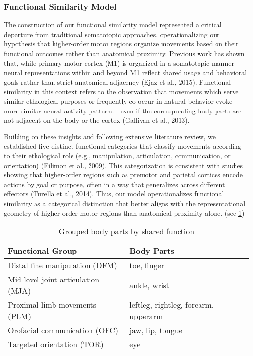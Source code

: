 \documentclass{article}
\begin{document}
\subsubsection{Functional Similarity Model}\label{models}
The construction of our functional similarity model represented a critical departure from traditional somatotopic approaches, operationalizing our hypothesis that higher-order motor regions organize movements based on their functional outcomes rather than anatomical proximity. Previous work has shown that, while primary motor cortex (M1) is organized in a somatotopic manner, neural representations within and beyond M1 reflect shared usage and behavioral goals rather than strict anatomical adjacency (Ejaz et al., 2015). Functional similarity in this context refers to the observation that movements which serve similar ethological purposes or frequently co-occur in natural behavior evoke more similar neural activity patterns—even if the corresponding body parts are not adjacent on the body or the cortex (Gallivan et al., 2013). 

Building on these insights and following extensive literature review, we established five distinct functional categories that classify movements according to their ethological role (e.g., manipulation, articulation, communication, or orientation) (Filimon et al., 2009). This categorization is consistent with studies showing that higher-order regions such as premotor and parietal cortices encode actions by goal or purpose, often in a way that generalizes across different effectors (Turella et al., 2014). Thus, our model operationalizes functional similarity as a categorical distinction that better aligns with the representational geometry of higher-order motor regions than anatomical proximity alone.
(see \ref{tab:grouped_func})
\begin{table}[h]
\centering
\begin{tabular}{|l|l|}
\hline
\textbf{Functional Group} & \textbf{Body Parts} \\
\hline
Distal fine manipulation (DFM) & toe, finger \\
Mid-level joint articulation (MJA) & ankle, wrist \\
Proximal limb movements (PLM) & leftleg, rightleg, forearm, upperarm \\
Orofacial communication (OFC) & jaw, lip, tongue \\
Targeted orientation (TOR) & eye \\
\hline
\end{tabular}
\caption{Grouped body parts by shared function}
\label{tab:grouped_func}
\end{table}
\end{document}
